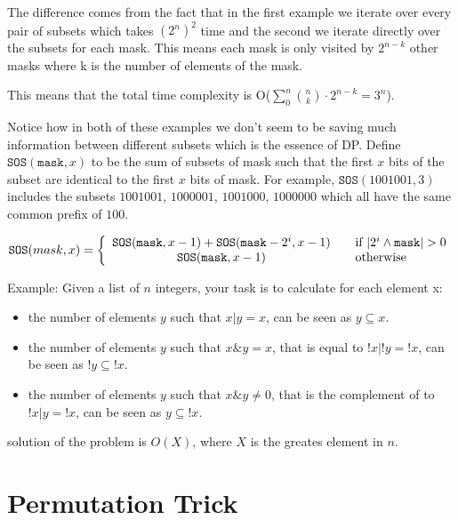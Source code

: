     The difference comes from the fact that in the first example we iterate over every pair of subsets which takes $(2^n)^2$ time and the second we iterate directly over the subsets for each mask. This means each mask is only visited by $2^{n - k}$ other masks where k is the number of elements of the mask.
    
    This means that the total time complexity is O($\sum_{0}^{n} {n \choose k} \cdot 2^{n - k} = 3^n$).

    Notice how in both of these examples we don't seem to be saving much information between different subsets which is the essence of DP.
    Define $\texttt{SOS}(\texttt{mask}, x)$ to be the sum of subsets of mask such that the first $x$ bits of the subset are identical to the first $x$ bits of mask.
    For example, $\texttt{SOS}(1001001, 3)$ includes the subsets $1001001$, $1000001$, $1001000$, $1000000$ which all have the same common prefix of $100$.
    

    $\texttt{SOS}(mask, x) = \left\{  \begin{array}{ c l }  \texttt{SOS}(\texttt{mask}, x - 1) + \texttt{SOS}(\texttt{mask} - 2^i, x - 1) & \quad \textrm{if } |2^i \wedge \texttt{mask}| > 0 \\  \texttt{SOS}(\texttt{mask}, x - 1) & \quad \textrm{otherwise}  \end{array} \right.$

    Example:
    Given a list of $n$ integers, your task is to calculate for each element x:
    
    \begin{itemize}
        \item the number of elements $y$ such that $x|y=x$, can be seen as $y \subseteq x$.
        \item the number of elements $y$ such that $x\&y=x$, that is equal to $!x|!y=!x$, can be seen as $!y \subseteq !x$.
        \item the number of elements $y$ such that $x\&y\neq0$, that is the complement of to $!x|y=!x$, can be seen as $y \subseteq !x$.
    \end{itemize}

    solution of the problem is $O(X)$, where $X$ is the greates element in $n$.
    
    
    
    \section{Permutation Trick}

